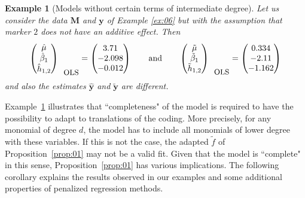 \documentclass{bmcart}
\newtheorem{example}{Example}
\newcommand{\M}{\mathbf{M}}
\newcommand{\0}{\mathbf{0}}
\newcommand{\y}{\mathbf{y}}
\begin{document}
\begin{example}[Models without certain terms of intermediate degree]\label{ex:07}
	Let us consider the data $\M$ and $\y$ of Example \ref{ex:06} but with the assumption that marker $2$ does not have an additive effect. Then
	$$\begin{pmatrix}
	\hat{\mu} \\
	\hat{\beta}_1 \\
	\hat{h}_{1,2}
	\end{pmatrix}_{\mbox{\small OLS}} = \begin{pmatrix}
	3.71 \\
	-2.098\\
	-0.012\\
	\end{pmatrix}
	\qquad \mbox{and} \qquad \begin{pmatrix}
	\tilde{\mu} \\
	\tilde{\beta}_1 \\
	\tilde{h}_{1,2}
	\end{pmatrix}_{\mbox{\small OLS}}= \begin{pmatrix}
	0.334\\
	-2.11 \\
	-1.162
	\end{pmatrix} $$
	and also the estimates $\hat{\y}$ and $\tilde{\y}$ are different. 
\end{example}
Example~\ref{ex:07} illustrates that ``completeness" of the model is required to have the possibility to adapt to translations of the coding. 
More precisely, for any monomial of degree $d$, the model has to include all monomials of lower degree with these variables. If this is not the case, the adapted $\tilde{f}$ of Proposition~\ref{prop:01} may not be a valid fit. Given that the model is ``complete" in this sense, Proposition~\ref{prop:01} has various implications.
The following corollary explains the results observed in our examples and some additional properties of penalized regression methods.  
\end{document}
